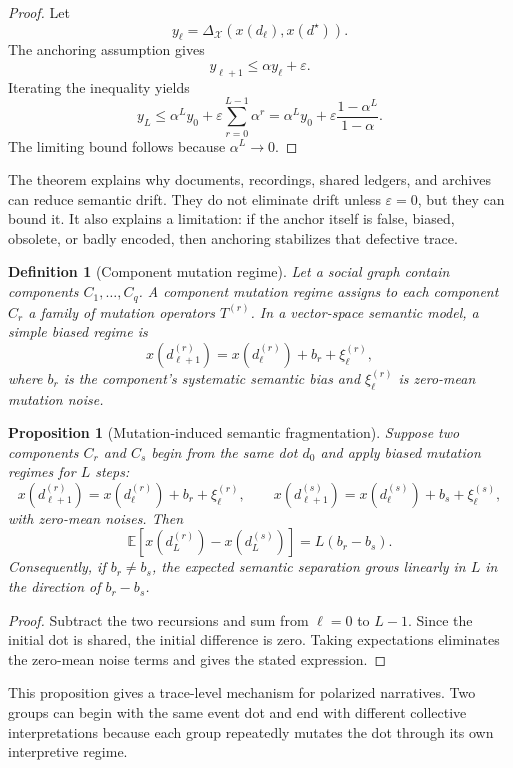 \documentclass[11pt]{article}
\newtheorem{definition}{Definition}
\newtheorem{proposition}{Proposition}
\theoremstyle{remark}
\begin{document}
\begin{proof}
Let
$$
y_{\ell}=\Delta_{\mathcal X}(x(d_{\ell}),x(d^\star)).
$$
The anchoring assumption gives
$$
y_{\ell+1}\leq \alpha y_{\ell}+\varepsilon.
$$
Iterating the inequality yields
$$
y_L\leq \alpha^L y_0+\varepsilon\sum_{r=0}^{L-1}\alpha^r
=\alpha^L y_0+\varepsilon\frac{1-\alpha^L}{1-\alpha}.
$$
The limiting bound follows because $\alpha^L\to0$.
\end{proof}

The theorem explains why documents, recordings, shared ledgers, and
archives can reduce semantic drift. They do not eliminate drift unless
$\varepsilon=0$, but they can bound it. It also explains a limitation:
if the anchor itself is false, biased, obsolete, or badly encoded, then
anchoring stabilizes that defective trace.

\begin{definition}[Component mutation regime]\label{def:component-mutation-regime}
Let a social graph contain components $C_1,\ldots,C_q$. A component
mutation regime assigns to each component $C_r$ a family of mutation
operators $T^{(r)}$. In a vector-space semantic model, a simple biased
regime is
$$
x(d_{\ell+1}^{(r)})=x(d_{\ell}^{(r)})+b_r+\xi_{\ell}^{(r)},
$$
where $b_r$ is the component's systematic semantic bias and
$\xi_{\ell}^{(r)}$ is zero-mean mutation noise.
\end{definition}

\begin{proposition}[Mutation-induced semantic fragmentation]\label{prop:mutation-induced-semantic-fragmentation}
Suppose two components $C_r$ and $C_s$ begin from the same dot $d_0$ and
apply biased mutation regimes for $L$ steps:
$$
x(d_{\ell+1}^{(r)})=x(d_{\ell}^{(r)})+b_r+\xi_{\ell}^{(r)},
\qquad
x(d_{\ell+1}^{(s)})=x(d_{\ell}^{(s)})+b_s+\xi_{\ell}^{(s)},
$$
with zero-mean noises. Then
$$
\mathbb E[x(d_L^{(r)})-x(d_L^{(s)})]=L(b_r-b_s).
$$
Consequently, if $b_r\neq b_s$, the expected semantic separation grows
linearly in $L$ in the direction of $b_r-b_s$.
\end{proposition}

\begin{proof}
Subtract the two recursions and sum from $\ell=0$ to $L-1$. Since the
initial dot is shared, the initial difference is zero. Taking
expectations eliminates the zero-mean noise terms and gives the stated
expression.
\end{proof}

This proposition gives a trace-level mechanism for polarized narratives.
Two groups can begin with the same event dot and end with different
collective interpretations because each group repeatedly mutates the dot
through its own interpretive regime.
\end{document}
